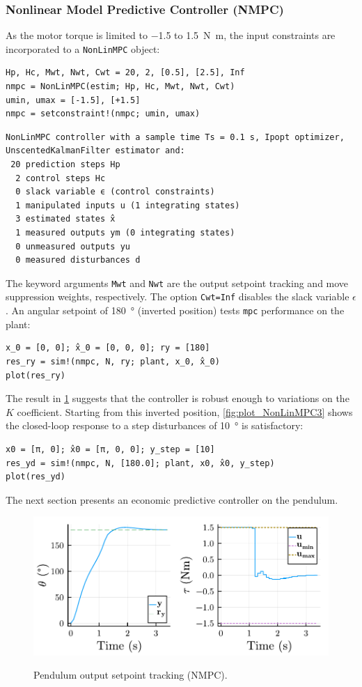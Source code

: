 \subsubsection{Nonlinear Model Predictive Controller (NMPC)}

As the motor torque is limited to \num{-1.5} to \SI{1.5}{\newton\meter}, the input constraints are incorporated to a \texttt{NonLinMPC} object:
\begin{verbatim}
Hp, Hc, Mwt, Nwt, Cwt = 20, 2, [0.5], [2.5], Inf
nmpc = NonLinMPC(estim; Hp, Hc, Mwt, Nwt, Cwt)
umin, umax = [-1.5], [+1.5]
nmpc = setconstraint!(nmpc; umin, umax)
\end{verbatim}
\spacerepl
\begin{verbatim}
NonLinMPC controller with a sample time Ts = 0.1 s, Ipopt optimizer, UnscentedKalmanFilter estimator and:
 20 prediction steps Hp
  2 control steps Hc
  0 slack variable ϵ (control constraints)
  1 manipulated inputs u (1 integrating states)
  3 estimated states x̂
  1 measured outputs ym (0 integrating states)
  0 unmeasured outputs yu
  0 measured disturbances d
\end{verbatim}
The keyword arguments \texttt{Mwt} and \texttt{Nwt} are the output setpoint tracking and move suppression weights, respectively. The option \texttt{Cwt=Inf} disables the slack variable $\epsilon$. An angular setpoint of \SI{180}{\degree} (inverted position) tests \texttt{mpc} performance on the plant:
\begin{verbatim}
x_0 = [0, 0]; x̂_0 = [0, 0, 0]; ry = [180]
res_ry = sim!(nmpc, N, ry; plant, x_0, x̂_0)
plot(res_ry)
\end{verbatim}
The result in \cref{fig:plot_NonLinMPC2} suggests that the controller is robust enough to variations on the $K$ coefficient. Starting from this inverted position, \cref{fig:plot_NonLinMPC3} shows the closed-loop response to a step disturbances of \SI{10}{\degree} is satisfactory:
\begin{verbatim}
x0 = [π, 0]; x̂0 = [π, 0, 0]; y_step = [10]
res_yd = sim!(nmpc, N, [180.0]; plant, x0, x̂0, y_step)
plot(res_yd)
\end{verbatim}
The next section presents an economic predictive controller on the pendulum.

\begin{figure}[t]
    \centering
    \caption{Pendulum output setpoint tracking (NMPC).}
    \includegraphics[width=0.5\columnwidth]{fig/plot_NonLinMPC2.pdf}
    \label{fig:plot_NonLinMPC2}
\end{figure}

